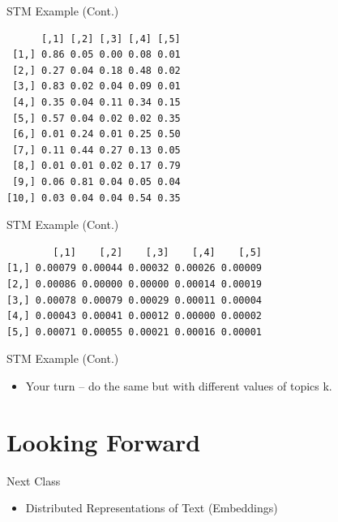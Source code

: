 \documentclass[
  ignorenonframetext,
  aspectratio=169]{beamer}
\newenvironment{Shaded}{\begin{snugshade}}{\end{snugshade}}
\newcommand{\CommentTok}[1]{\textcolor[rgb]{0.56,0.35,0.01}{\textit{#1}}}
\newcommand{\DecValTok}[1]{\textcolor[rgb]{0.00,0.00,0.81}{#1}}
\newcommand{\FunctionTok}[1]{\textcolor[rgb]{0.13,0.29,0.53}{\textbf{#1}}}
\newcommand{\NormalTok}[1]{#1}
\newcommand{\OtherTok}[1]{\textcolor[rgb]{0.56,0.35,0.01}{#1}}
\newcommand{\SpecialCharTok}[1]{\textcolor[rgb]{0.81,0.36,0.00}{\textbf{#1}}}
\begin{document}
\begin{frame}[fragile]{STM Example (Cont.)}
\begin{Shaded}
\end{Shaded}

\begin{verbatim}
      [,1] [,2] [,3] [,4] [,5]
 [1,] 0.86 0.05 0.00 0.08 0.01
 [2,] 0.27 0.04 0.18 0.48 0.02
 [3,] 0.83 0.02 0.04 0.09 0.01
 [4,] 0.35 0.04 0.11 0.34 0.15
 [5,] 0.57 0.04 0.02 0.02 0.35
 [6,] 0.01 0.24 0.01 0.25 0.50
 [7,] 0.11 0.44 0.27 0.13 0.05
 [8,] 0.01 0.01 0.02 0.17 0.79
 [9,] 0.06 0.81 0.04 0.05 0.04
[10,] 0.03 0.04 0.04 0.54 0.35
\end{verbatim}
\end{frame}

\begin{frame}[fragile]{STM Example (Cont.)}
\label{stm-example-cont.-1}
\scriptsize

\begin{Shaded}
\end{Shaded}

\begin{verbatim}
        [,1]    [,2]    [,3]    [,4]    [,5]
[1,] 0.00079 0.00044 0.00032 0.00026 0.00009
[2,] 0.00086 0.00000 0.00000 0.00014 0.00019
[3,] 0.00078 0.00079 0.00029 0.00011 0.00004
[4,] 0.00043 0.00041 0.00012 0.00000 0.00002
[5,] 0.00071 0.00055 0.00021 0.00016 0.00001
\end{verbatim}
\end{frame}

\begin{frame}{STM Example (Cont.)}
\label{stm-example-cont.-2}
\begin{itemize}
\item Your turn -- do the same but with different values of topics k. 
\end{itemize}
\end{frame}

\section{Looking Forward}\label{looking-forward}

\begin{frame}{Next Class}
\label{next-class}
\begin{itemize}
\item Distributed Representations of Text (Embeddings)
\end{itemize}
\end{frame}
\end{document}
